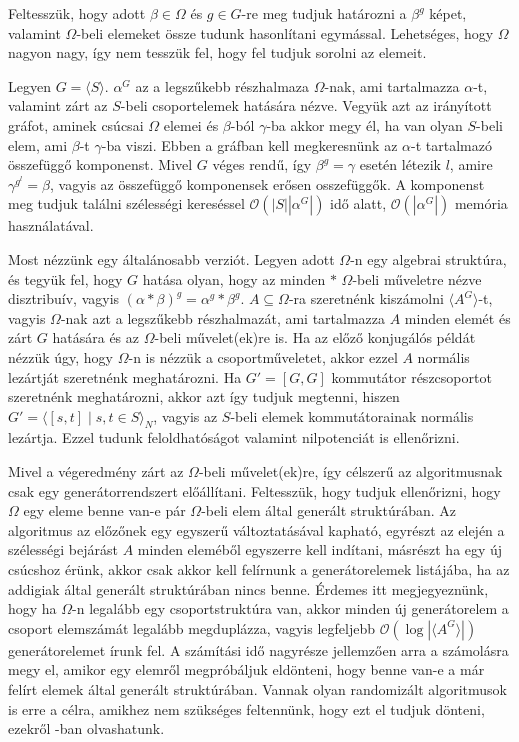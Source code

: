 Feltesszük, hogy adott $\beta\in\Omega$ és $g\in G$-re meg tudjuk határozni a $\beta^g$ képet, valamint $\Omega$-beli
elemeket össze tudunk hasonlítani egymással. Lehetséges, hogy $\Omega$ nagyon nagy, így nem tesszük fel, hogy fel tudjuk sorolni az elemeit.

Legyen $G=\langle S\rangle$. $\alpha^G$ az a legszűkebb részhalmaza $\Omega$-nak, ami tartalmazza $\alpha$-t, valamint zárt az $S$-beli csoportelemek hatására nézve.
Vegyük azt az irányított gráfot, aminek csúcsai $\Omega$ elemei és $\beta$-ból $\gamma$-ba akkor megy él, ha van olyan $S$-beli elem, ami $\beta$-t $\gamma$-ba viszi.
Ebben a gráfban kell megkeresnünk az $\alpha$-t tartalmazó összefüggő komponenst.
Mivel $G$ véges rendű, így $\beta^g=\gamma$ esetén létezik $l$, amire $\gamma^{g^l}=\beta$, vagyis az összefüggő komponensek erősen osszefüggők.
A komponenst meg tudjuk találni szélességi kereséssel $\mathcal{O}(|S| |\alpha^G|)$ idő alatt, $\mathcal{O}(|\alpha^G|)$ memória használatával.

Most nézzünk egy általánosabb verziót.
Legyen adott $\Omega$-n egy algebrai struktúra, és tegyük fel, hogy $G$ hatása olyan, hogy az minden $*$ $\Omega$-beli műveletre nézve disztribuív,
vagyis $(\alpha * \beta)^g = \alpha^g * \beta^g$.
$A \subseteq \Omega$-ra szeretnénk kiszámolni $\langle A^G \rangle$-t, vagyis
$\Omega$-nak azt a legszűkebb részhalmazát, ami tartalmazza $A$ minden elemét és zárt $G$ hatására és az $\Omega$-beli művelet(ek)re is.
Ha az előző konjugálós példát nézzük úgy, hogy $\Omega$-n is nézzük a csoportműveletet, akkor ezzel $A$ normális lezártját szeretnénk meghatározni.
Ha $G'=[G,G]$ kommutátor részcsoportot szeretnénk meghatározni,
akkor azt így tudjuk megtenni, hiszen $G'=\langle[s,t] \mid s,t \in S\rangle_N$, vagyis az $S$-beli elemek kommutátorainak normális lezártja.
Ezzel tudunk feloldhatóságot valamint nilpotenciát is ellenőrizni.

Mivel a végeredmény zárt az $\Omega$-beli művelet(ek)re, így célszerű az algoritmusnak csak egy generátorrendszert előállítani.
Feltesszük, hogy tudjuk ellenőrizni, hogy $\Omega$ egy eleme benne van-e pár $\Omega$-beli elem által generált struktúrában.
Az algoritmus az előzőnek egy egyszerű változtatásával kapható, egyrészt az elején a szélességi bejárást $A$ minden eleméből egyszerre kell indítani,
másrészt ha egy új csúcshoz érünk, akkor csak akkor kell felírnunk a generátorelemek listájába, ha az addigiak által generált struktúrában nincs benne.
Érdemes itt megjegyeznünk, hogy ha $\Omega$-n legalább egy csoportstruktúra van, akkor minden új generátorelem a csoport elemszámát legalább megduplázza,
vagyis legfeljebb $\mathcal{O}(\log|\langle A^G\rangle |)$ generátorelemet írunk fel. A számítási idő nagyrésze jellemzően arra a számolásra megy el, amikor egy elemről
megpróbáljuk eldönteni, hogy benne van-e a már felírt elemek által generált struktúrában. Vannak olyan randomizált algoritmusok is erre a célra, amikhez nem szükséges feltennünk,
hogy ezt el tudjuk dönteni, ezekről \cite{Ser03}-ban olvashatunk.

